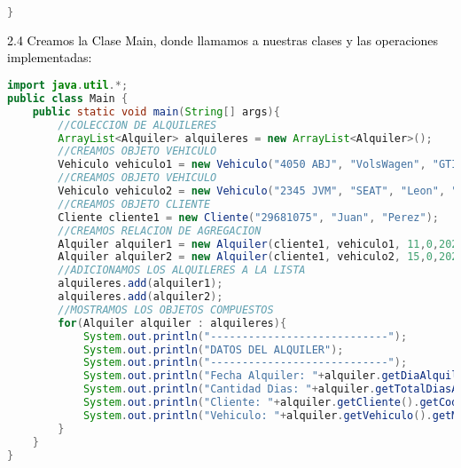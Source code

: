 \documentclass{article}
\begin{document}
\begin{itemize}
\begin{itemize}
\begin{lstlisting}[language=java]
}
        \end{lstlisting}
        \textcolor{black}{2.4 Creamos la Clase Main, donde llamamos a nuestras clases y las operaciones implementadas:  }
        \begin{lstlisting}[language=java]
import java.util.*;
public class Main {
    public static void main(String[] args){
        //COLECCION DE ALQUILERES
        ArrayList<Alquiler> alquileres = new ArrayList<Alquiler>();
        //CREAMOS OBJETO VEHICULO
        Vehiculo vehiculo1 = new Vehiculo("4050 ABJ", "VolsWagen", "GTI", "Blanco", 100.0, true);
        //CREAMOS OBJETO VEHICULO
        Vehiculo vehiculo2 = new Vehiculo("2345 JVM", "SEAT", "Leon", "Negro", 80.0, true);
        //CREAMOS OBJETO CLIENTE
        Cliente cliente1 = new Cliente("29681075", "Juan", "Perez");
        //CREAMOS RELACION DE AGREGACION
        Alquiler alquiler1 = new Alquiler(cliente1, vehiculo1, 11,0,2021,2);
        Alquiler alquiler2 = new Alquiler(cliente1, vehiculo2, 15,0,2021,3);
        //ADICIONAMOS LOS ALQUILERES A LA LISTA
        alquileres.add(alquiler1);
        alquileres.add(alquiler2);
        //MOSTRAMOS LOS OBJETOS COMPUESTOS
        for(Alquiler alquiler : alquileres){
            System.out.println("----------------------------");
            System.out.println("DATOS DEL ALQUILER");
            System.out.println("----------------------------");
            System.out.println("Fecha Alquiler: "+alquiler.getDiaAlquiler()+"/"+alquiler.getMesAlquiler()+"/"+alquiler.getAñoAlquiler());
            System.out.println("Cantidad Dias: "+alquiler.getTotalDiasAlquiler());
            System.out.println("Cliente: "+alquiler.getCliente().getCodigo()+" "+alquiler.getCliente().getNombre()+" "+alquiler.getCliente().getApellidos());
            System.out.println("Vehiculo: "+alquiler.getVehiculo().getMatricula()+" "+alquiler.getVehiculo().getMarca()+" "+alquiler.getVehiculo().getModelo());
        }
    }
}


\end{lstlisting}
\end{itemize}
\end{itemize}
\end{document}
